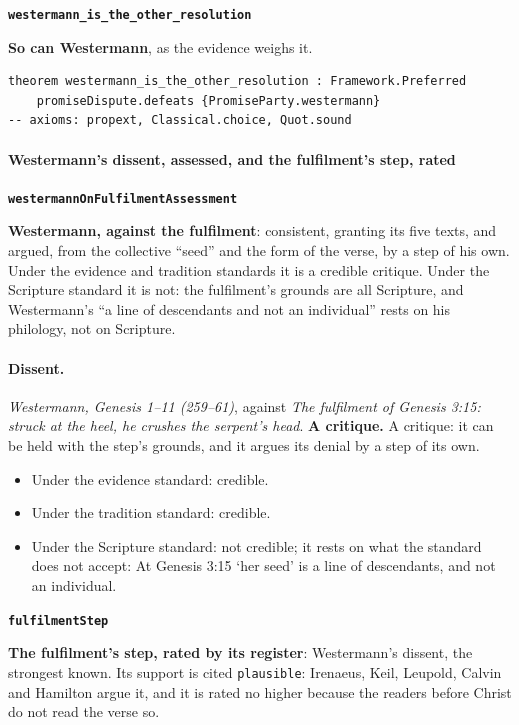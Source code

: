 \documentclass[11pt]{article}
\begin{document}
\par\medskip\noindent\textbf{\texttt{westermann\_\allowbreak{}is\_\allowbreak{}the\_\allowbreak{}other\_\allowbreak{}resolution}}\par\nobreak\noindent
\textbf{So can Westermann}, as the evidence weighs it.

{\small\begin{verbatim}
theorem westermann_is_the_other_resolution : Framework.Preferred
    promiseDispute.defeats {PromiseParty.westermann}
-- axioms: propext, Classical.choice, Quot.sound
\end{verbatim}}
\paragraph*{Westermann’s dissent, assessed, and the fulfilment’s step, rated}
\leavevmode\par\nobreak
\par\medskip\noindent\textbf{\texttt{westermann\allowbreak{}On\allowbreak{}Fulfilment\allowbreak{}Assessment}}\par\nobreak\noindent
\textbf{Westermann, against the fulfilment}: consistent, granting its five texts, and argued, from the collective “seed” and the form of the verse, by a step of his own. Under the evidence and tradition standards it is a credible critique. Under the Scripture standard it is not: the fulfilment’s grounds are all Scripture, and Westermann’s “a line of descendants and not an individual” rests on his philology, not on Scripture.

\paragraph{Dissent.} \emph{Westermann, Genesis 1–11 (259–61)}, against \emph{The fulfilment of Genesis 3:15: struck at the heel, he crushes the serpent’s head}. \textbf{A critique.} A critique: it can be held with the step’s grounds, and it argues its denial by a step of its own.
\begin{itemize}
\item Under the evidence standard: credible.
\item Under the tradition standard: credible.
\item Under the Scripture standard: not credible; it rests on what the standard does not accept: At Genesis 3:15 ‘her seed’ is a line of descendants, and not an individual.
\end{itemize}
\par\medskip\noindent\textbf{\texttt{fulfilment\allowbreak{}Step}}\par\nobreak\noindent
\textbf{The fulfilment’s step, rated by its register}: Westermann’s dissent, the strongest known. Its support is cited \texttt{plausible}: Irenaeus, Keil, Leupold, Calvin and Hamilton argue it, and it is rated no higher because the readers before Christ do not read the verse so.
\end{document}
